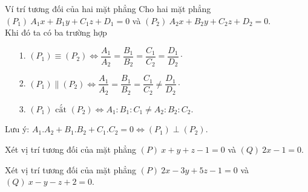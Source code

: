 \begin{dang}{Ví trí tương đối của hai mặt phẳng}
	Cho hai mặt phẳng $ (P_1) \ A_1 x + B_1 y + C_1 z + D_1 = 0 $ và $ (P_2) \ A_2 x + B_2 y + C_2 z + D_2 =0 $.	\\
	Khi đó ta có ba trường hợp
	\begin{itemize}
		\item[1.] $ (P_1) \equiv (P_2)  \Leftrightarrow \dfrac{A_1}{A_2}=\dfrac{B_1}{B_2} = \dfrac{C_1}{C_2}=\dfrac{D_1}{D_2} \cdot $
		\item[2.] $ (P_1) \parallel (P_2)  \Leftrightarrow \dfrac{A_1}{A_2}=\dfrac{B_1}{B_2} = \dfrac{C_1}{C_2}\neq \dfrac{D_1}{D_2} \cdot $
		\item[3.] $ (P_1) \textrm{ cắt } (P_2)  \Leftrightarrow A_1 : B_1 : C_1 \neq A_2 : B_2 : C_2.$
	\end{itemize}	
	Lưu ý: $ A_1.A_2 + B_1.B_2 + C_1.C_2 = 0 \Leftrightarrow (P_1) \perp (P_2) $.
\end{dang}
\begin{vd}%
	Xét vị trí tương đối của mặt phẳng $ (P) \ x + y + z -1 = 0 $ và $ (Q) \ 2x  -1 = 0 $.
\end{vd}
\begin{vd}%
	Xét vị trí tương đối của mặt phẳng $ (P) \ 2x-3y+5z - 1 = 0 $ và $ (Q) \ x - y - z + 2 = 0 $.
\end{vd}
